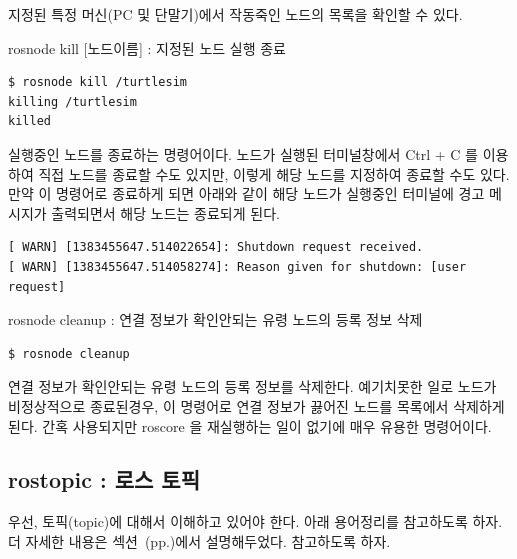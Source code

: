 \vspace{\baselineskip}
\noindent
지정된 특정 머신(PC 및 단말기)에서 작동죽인 노드의 목록을 확인할 수 있다.

\vspace{\baselineskip}
\noindent
{}\circled{\thenum} rosnode kill [노드이름] : 지정된 노드 실행 종료
\begin{lstlisting}[language=ROS]
$ rosnode kill /turtlesim
killing /turtlesim
killed
\end{lstlisting}

\vspace{\baselineskip}
\noindent
실행중인 노드를 종료하는 명령어이다. 노드가 실행된 터미널창에서 Ctrl + C 를 이용하여 직접 노드를 종료할 수도 있지만, 이렇게 해당 노드를 지정하여 종료할 수도 있다. 만약 이 명령어로 종료하게 되면 아래와 같이 해당 노드가 실행중인 터미널에 경고 메시지가 출력되면서 해당 노드는 종료되게 된다.

\begin{lstlisting}[language=ROS]
[ WARN] [1383455647.514022654]: Shutdown request received.
[ WARN] [1383455647.514058274]: Reason given for shutdown: [user request]
\end{lstlisting}

\vspace{\baselineskip}
\noindent
{}\circled{\thenum} rosnode cleanup : 연결 정보가 확인안되는 유령 노드의 등록 정보 삭제
\begin{lstlisting}[language=ROS]
$ rosnode cleanup 
\end{lstlisting}

\vspace{\baselineskip}
\noindent
연결 정보가 확인안되는 유령 노드의 등록 정보를 삭제한다. 예기치못한 일로 노드가 비정상적으로 종료된경우, 이 명령어로 연결 정보가 끓어진 노드를 목록에서 삭제하게된다. 간혹 사용되지만 roscore 을 재실행하는 일이 없기에 매우 유용한 명령어이다.


\subsection{rostopic : 로스 토픽}

우선, 토픽(topic)에 대해서 이해하고 있어야 한다. 아래 용어정리를 참고하도록 하자. 더 자세한 내용은 섹션~(pp.\pageref{def:RosTopic})에서 설명해두었다. 참고하도록 하자.

